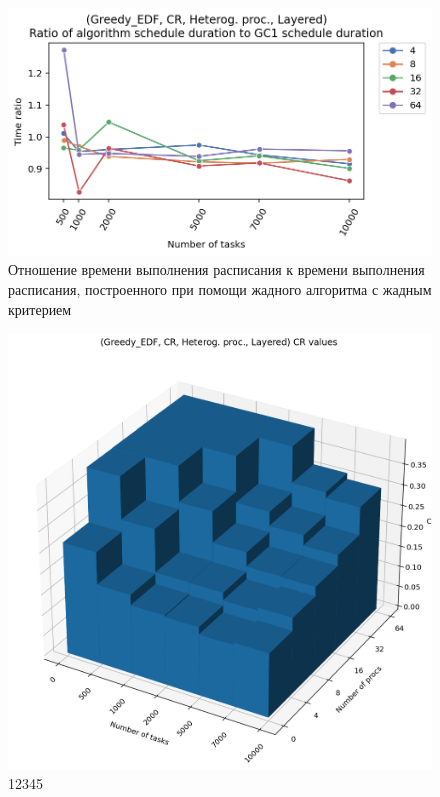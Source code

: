 \begin{figure}[!htbp]
    \centering
    \includegraphics[width=\textwidth]{imgs/unbalanced/CR_EDF/gr_amalgamated.png}
    \caption{Отношение времени выполнения расписания к времени выполнения расписания, построенного при помощи жадного алгоритма с жадным критерием}
    \label{fig:CR-disbalanced-EDF-times-compiled}
\end{figure}

\begin{figure}[!htbp]
    \centering
    \includegraphics[width=\textwidth]{imgs/unbalanced/CR_EDF/cr_3d.png}
    \caption{12345}
\end{figure}

